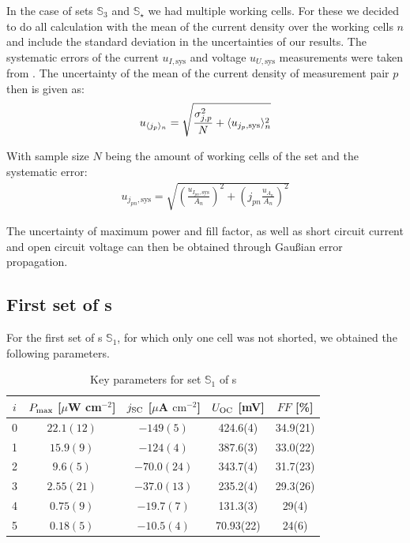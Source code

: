 \documentclass[a4paper,10pt,twocolumn]{article}
\begin{document}
\begin{extract*}
In the case of sets $\mathbb{S}_3$ and $\mathbb{S}_\star$ we had multiple working cells. For these we decided to do all calculation with the mean of the current density over the working cells $n$ and include the standard deviation in the uncertainties of our results. The systematic errors of the current $u_{I,\text{sys}}$ and voltage $u_{U,\text{sys}}$ measurements were taken from \cite{keithley}. The uncertainty of the mean of the current density of measurement pair $p$ then is given as:
\begin{align}
	u_{\langle j_p \rangle_n} = \sqrt{\frac{\sigma_{j,p}^2}{N} + \langle u_{j_p,\text{sys}} \rangle_n^2}
\end{align}

With sample size $N$ being the amount of working cells of the set and the systematic error:
\begin{align}
	u_{j_{pn},\text{sys}} = \sqrt{ \left( \frac{ u_{I_{pn},\text{sys}}}{A_n}\right)^2+\left( j_{pn}\frac{u_{A_n}}{A_n} \right)^2}
\end{align}

The uncertainty of maximum power and fill factor, as well as short circuit current and open circuit voltage can then be obtained through Gaußian error propagation.

\subsection{First set of \BHSC s}\label{subsec:S1data}

For the first set of \BHSC s $\mathbb{S}_1$, for which only one cell was not shorted, we obtained the following parameters.
\begin{table}[H]\centering
	\caption{Key parameters for set $\mathbb{S}_1$ of \BHSC s}
	\label{tab:keyparams1}
	\begin{tabular}{@{}ccccc@{}}\toprule
		$i$ & $P_{\text{max}}$ [$\mu$W cm$^{-2}$] & $j_{\text{SC}}$ [$\mu$A $\mathrm{cm}^{-2}$] & $U_{\text{OC}}$ [mV] & $FF$ [\%]\\\midrule
		0 &  $ 22.1(12) $ & $ -149(5) $ & 424.6(4) & 34.9(21) \\
		1 &  $ 15.9(9) $ & $ -124(4) $ & 387.6(3) & 33.0(22) \\
		2 &  $ 9.6(5) $ & $ -70.0(24) $ & 343.7(4) & 31.7(23) \\
		3 &  $ 2.55(21) $ & $ -37.0(13) $ & 235.2(4) & 29.3(26) \\
		4 &  $ 0.75(9) $ & $ -19.7(7) $ & 131.3(3) & 29(4)\\
		5 &  $ 0.18(5) $ & $ -10.5(4) $ & 70.93(22) & 24(6) \\\bottomrule
	\end{tabular}
\end{table}


\end{extract*}
\end{document}

